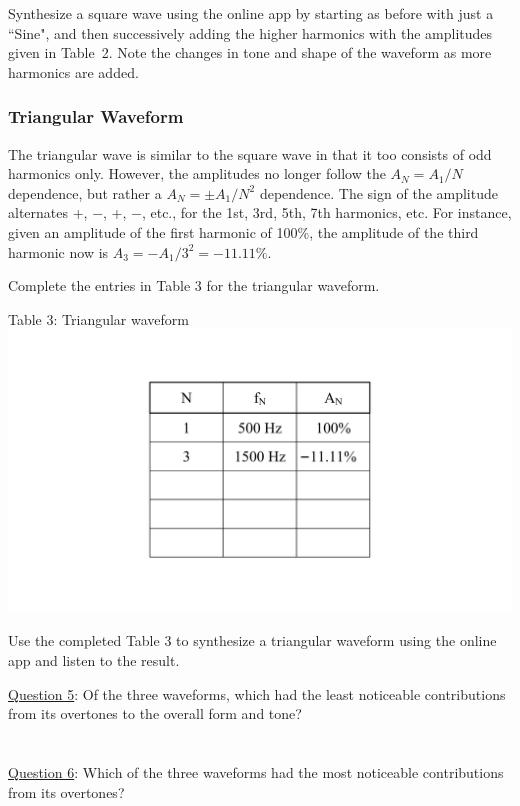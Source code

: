 \documentclass[11pt]{NSF}
\begin{document}
Synthesize a square wave using the online app by starting as
before with just a ``Sine", and then successively adding the
higher harmonics with the amplitudes given in Table~2.
Note the changes in tone and shape of the waveform as more
harmonics are added.

\subsubsection{Triangular Waveform}

The triangular wave is similar to the square wave in that 
it too consists of odd harmonics only. However, 
the amplitudes no longer follow the $A_N=A_1/N$ dependence, 
but rather a $A_N = \pm A_1/N^2$ dependence. 
The sign of the amplitude alternates +, $-$, +, $-$, etc.,
for the 1st, 3rd, 5th, 7th harmonics, etc.
For instance, given an amplitude of the first harmonic of 100\%, 
the amplitude of the third harmonic now is
$A_3 = -A_1/3^2 = -11.11\%$.

Complete the entries in Table 3 for the triangular waveform.
%
\begin{table}[hbtp]
\begin{center}
Table 3: Triangular waveform\\
\includegraphics[width=.35\textwidth]{tab5_3}
\label{t:3}
\end{center}
\end{table}
%

Use the completed Table 3 to synthesize a triangular 
waveform using the online app and listen to the result.

\underline{Question 5}: Of the three waveforms, which had the least noticeable 
contributions from its overtones to the overall form and tone?
\\
\\
\\

\underline{Question 6}: Which of the three waveforms had the most 
noticeable contributions from its overtones?
\\
\\
\\
\end{document}
